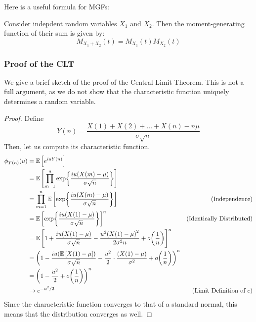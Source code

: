 Here is a useful formula for MGFs:
\begin{theorem} 
    Consider indepdent random variables $X_1$ and $X_2$. Then the moment-generating function of their sum is given by:
    \[ M_{X_1 + X_2}(t) = M_{X_1}(t) M_{X_2}(t) \]
\end{theorem}

\subsubsection{Proof of the CLT}
We give a brief sketch of the proof of the Central Limit Theorem. This is not a full argument,
as we do not show that the characteristic function uniquely determines a random variable.

\begin{proof}
    Define
    \[ Y(n) = \frac{X(1) + X(2) + \dots + X(n) - n\mu}{\sigma \sqrt{n}} \]
    Then, let us compute its characteristic function.
    \begin{align*}
        \phi_{Y(n)}(u) &= \mathbb{E}\left[ e^{iuY(n)} \right] \\
        &= \mathbb{E}\left[ \prod_{m = 1}^n \exp{\frac{iu(X(m) - \mu)}{\sigma \sqrt{n}}} \right] \\
        &= \prod_{m = 1}^n \mathbb{E}\left[ \exp{\frac{iu(X(m) - \mu)}{\sigma \sqrt{n}}} \right] & \text{(Independence)} \\
        &= \mathbb{E}\left[ \exp{\frac{iu(X(1) - \mu)}{\sigma \sqrt{n}}} \right]^n & \text{(Identically Distributed)} \\
        &= \mathbb{E}\left[ 1 + \frac{iu\qty(X(1) - \mu)}{\sigma \sqrt{n}} - \frac{u^2\qty(X(1) - \mu)^2}{2\sigma^2 n} + o\qty(\frac{1}{n}) \right]^n \\
        &= \qty(1 - \frac{iu(\mathbb{E}\left[ X(1) - \mu \right])}{\sigma\sqrt{n}} - \frac{u^2}{2} \cdot \frac{\qty(X(1) - \mu)}{\sigma^2} + o\qty(\frac{1}{n}))^n \\
        &= \qty(1 - \frac{u^2}{2} + o\qty(\frac{1}{n}))^n \\
        &\to e^{-u^2/2} & \text{(Limit Definition of $e$)}
    \end{align*}
    Since the characteristic function converges to that of a standard normal, this means that the distribution converges as well.
\end{proof}